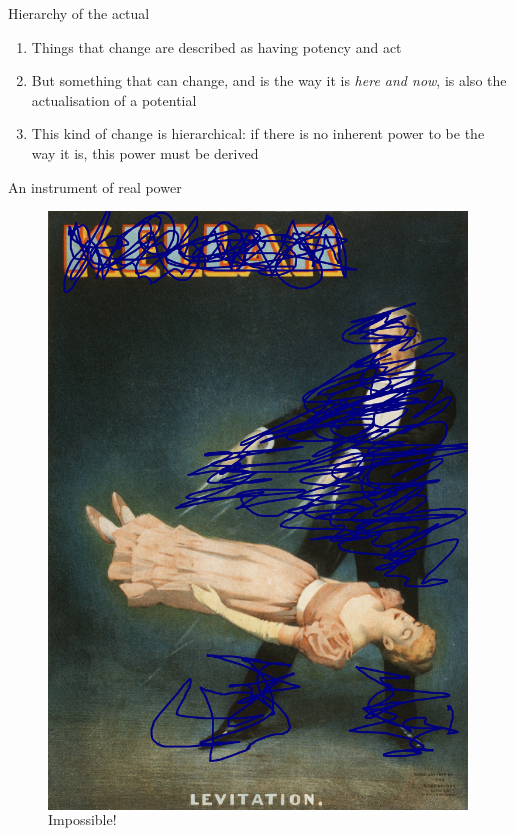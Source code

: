 \documentclass[xcolor=dvipsnames]{beamer}
\begin{document}
\begin{frame}[fragile]{Hierarchy of the actual}
  \begin{enumerate}
  \item Things that change are described as having potency and act \vspace{5mm}
  \item But something that can change, and is the way it is \emph{here and now}, is also the actualisation of a potential \vspace{5mm}
    \item This kind of change is hierarchical: if there is no inherent power to be the way it is, this power must be derived
  \end{enumerate}
\end{frame}

\begin{frame}{An instrument of real power}
\begin{figure}
  \centering
  \begin{columns}
    \centering
    \caption {Impossible!}
    \includegraphics[width=0.99\textwidth]{levitation2}

\end{columns}
\end{figure}
\end{frame}
\end{document}
